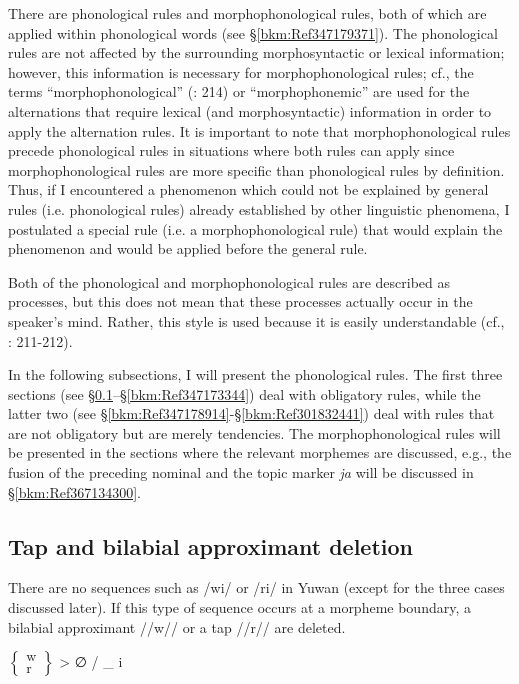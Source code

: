 There are phonological rules and morphophonological rules, both of which are applied within phonological words (see §\ref{bkm:Ref347179371}). The phonological rules are not affected by the surrounding morphosyntactic or lexical information; however, this information is necessary for morphophonological rules; cf., the terms “morphophonological” (\citealt{HaspelmathSims2010}: 214) or “morphophonemic” \citep[23-24]{Payne1997} are used for the alternations that require lexical (and morphosyntactic) information in order to apply the alternation rules. It is important to note that morphophonological rules precede phonological rules in situations where both rules can apply since morphophonological rules are more specific than phonological rules by definition. Thus, if I encountered a phenomenon which could not be explained by general rules (i.e. phonological rules) already established by other linguistic phenomena, I postulated a special rule (i.e. a morphophonological rule) that would explain the phenomenon and would be applied before the general rule.

  Both of the phonological and morphophonological rules are described as processes, but this does not mean that these processes actually occur in the speaker’s mind. Rather, this style is used because it is easily understandable (cf., \citealt{HaspelmathSims2010}: 211-212).

  In the following subsections, I will present the phonological rules. The first three sections (see §\ref{bkm:Ref304225942}--§\ref{bkm:Ref347173344}) deal with obligatory rules, while the latter two (see §\ref{bkm:Ref347178914}{}-§\ref{bkm:Ref301832441}) deal with rules that are not obligatory but are merely tendencies. The morphophonological rules will be presented in the sections where the relevant morphemes are discussed, e.g., the fusion of the preceding nominal and the topic marker \textit{ja} will be discussed in §\ref{bkm:Ref367134300}.

\subsection{Tap and bilabial approximant deletion}
\label{bkm:Ref304225942}\hypertarget{RefHeadingToc395696978}{}\label{bkm:Ref381399452}
There are no sequences such as /wi/ or /ri/ in Yuwan (except for the three cases discussed later). If this type of sequence occurs at a morpheme boundary, a bilabial approximant //w// or a tap //r// are deleted.

\ea $\left\{\begin{array}{c} \text{w}\\\text{r}\end{array}\right\}$ > ∅ / \_ i 

